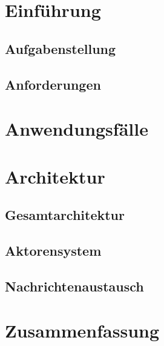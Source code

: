 \section{Einführung}\label{sec:intro} %
% 

    \subsection{Aufgabenstellung}\label{sec:task_definition} %


    \subsection{Anforderungen}\label{sec:requirements} %

\newpage
\section{Anwendungsfälle}\label{sec:use_cases} %
% 

\newpage
\section{Architektur}\label{sec:architecture} %
% 

    \subsection{Gesamtarchitektur}\label{sec:overall_architecture} %

    \subsection{Aktorensystem}\label{sec:actor_system} %

    \subsection{Nachrichtenaustausch}\label{sec:message_exchange} %

\newpage
\section{Zusammenfassung}\label{sec:conclusion} %
% 
